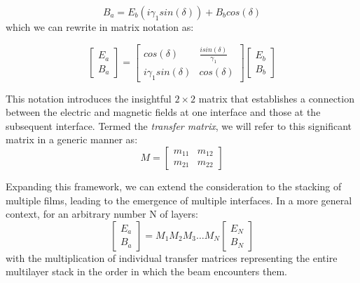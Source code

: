     \begin{equation} \label{B_a in terms of E_b and B_b}
    B_a = E_b(i\gamma_1sin(\delta)) + B_bcos(\delta)
    \end{equation}
which we can rewrite in matrix notation as:

    \[
      \begin{bmatrix}\label{Full form transfer matrix}
        E_a  \\
        B_a
      \end{bmatrix} = 
            \begin{bmatrix}
            cos(\delta) & \frac{isin(\delta)}{\gamma_1}    \\
            i\gamma_1sin(\delta) & cos(\delta)
            \end{bmatrix}
            \begin{bmatrix}
            E_b  \\
            B_b
          \end{bmatrix}
    \]

This notation introduces the insightful $2 \times 2$ matrix that establishes a connection between the electric and magnetic fields at one interface and those at the subsequent interface. Termed the \emph{transfer matrix}, we will refer to this significant matrix in a generic manner as: %
    \[
    M=
      \begin{bmatrix}
        m_{11} & m_{12}  \\
        m_{21} & m_{22}
      \end{bmatrix}
    \]

Expanding this framework, we can extend the consideration to the stacking of multiple films, leading to the emergence of multiple interfaces. In a more general context, for an arbitrary number N of layers: %
    \[
      \begin{bmatrix}
        E_a  \\
        B_a
      \end{bmatrix} = 
            M_1M_2M_3\hdots M_N
            \begin{bmatrix}
            E_N \\
            B_N
          \end{bmatrix}
    \]
with the multiplication of individual transfer matrices representing the entire multilayer stack in the order in which the beam encounters them.

